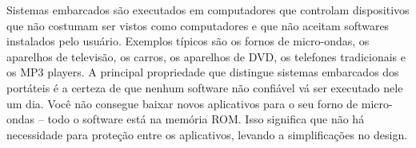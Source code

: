 Sistemas embarcados são executados em computadores que controlam dispositivos que não costumam ser vistos como computadores e que não aceitam softwares instalados pelo usuário. Exemplos típicos são os fornos de micro-ondas, os aparelhos de televisão, os carros, os aparelhos de DVD, os telefones tradicionais e os MP3 players. A principal propriedade que distingue sistemas embarcados dos portáteis é a certeza de que nenhum software não confiável vá ser executado nele um dia. Você não consegue baixar novos aplicativos para o seu forno de micro-ondas – todo o software está na memória ROM. Isso significa que não há necessidade para proteção entre os aplicativos, levando a simplificações no design. 
